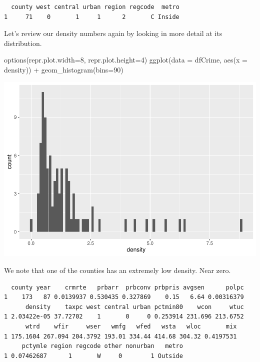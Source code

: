 \documentclass[]{article}
\newenvironment{Shaded}{}{}
\newcommand{\DataTypeTok}[1]{#1}
\newcommand{\DecValTok}[1]{#1}
\newcommand{\FloatTok}[1]{#1}
\newcommand{\KeywordTok}[1]{\textcolor[rgb]{0.00,0.00,1.00}{#1}}
\newcommand{\NormalTok}[1]{#1}
\newcommand{\OperatorTok}[1]{#1}
\newcommand{\StringTok}[1]{\textcolor[rgb]{0.00,0.50,0.50}{#1}}
\begin{document}
\begin{verbatim}
  county west central urban region regcode  metro
1     71    0       1     1      2       C Inside
\end{verbatim}

Let's review our density numbers again by looking in more detail at its
distribution.

\begin{Shaded}
\begin{Highlighting}[]
\KeywordTok{options}\NormalTok{(}\DataTypeTok{repr.plot.width=}\DecValTok{8}\NormalTok{, }\DataTypeTok{repr.plot.height=}\DecValTok{4}\NormalTok{)}
\KeywordTok{ggplot}\NormalTok{(}\DataTypeTok{data =}\NormalTok{ dfCrime, }\KeywordTok{aes}\NormalTok{(}\DataTypeTok{x =}\NormalTok{ density)) }\OperatorTok{+}\StringTok{ }
\StringTok{      }\KeywordTok{geom_histogram}\NormalTok{(}\DataTypeTok{bins=}\DecValTok{90}\NormalTok{)}
\end{Highlighting}
\end{Shaded}

\includegraphics{Bagnard_Gaustad_Hartman_Leung_Lab_3_files/figure-latex/unnamed-chunk-43-1.pdf}

We note that one of the counties has an extremely low density. Near
zero.

\begin{Shaded}
\end{Shaded}

\begin{verbatim}
  county year    crmrte   prbarr  prbconv prbpris avgsen      polpc
1    173   87 0.0139937 0.530435 0.327869    0.15   6.64 0.00316379
      density    taxpc west central urban pctmin80    wcon     wtuc
1 2.03422e-05 37.72702    1       0     0 0.253914 231.696 213.6752
      wtrd    wfir     wser   wmfg   wfed   wsta   wloc       mix
1 175.1604 267.094 204.3792 193.01 334.44 414.68 304.32 0.4197531
     pctymle region regcode other nonurban   metro
1 0.07462687      1       W     0        1 Outside
\end{verbatim}
\end{document}
